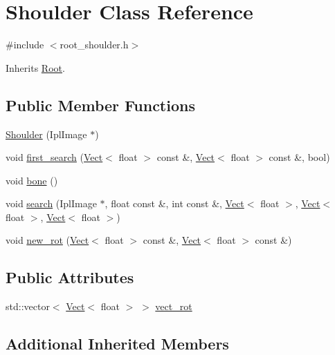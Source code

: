 \hypertarget{class_shoulder}{\section{Shoulder Class Reference}
\label{class_shoulder}
}


{\ttfamily \#include $<$root\+\_\+shoulder.\+h$>$}



Inherits \hyperlink{class_root}{Root}.

\subsection*{Public Member Functions}
\begin{DoxyCompactItemize}
\item 
\hyperlink{class_shoulder_a82e8026dd1fbec038d20d50f094918c9}{Shoulder} (Ipl\+Image $\ast$)
\item 
void \hyperlink{class_shoulder_a50b0698dc9e1fc894c06da6ce51643c2}{first\+\_\+search} (\hyperlink{class_vect}{Vect}$<$ float $>$ const \&, \hyperlink{class_vect}{Vect}$<$ float $>$ const \&, bool)
\item 
void \hyperlink{class_shoulder_a9192e90365e74d81fd26612a8538808f}{bone} ()
\item 
void \hyperlink{class_shoulder_ae1b8830114437b4caa5eef357abcf4a7}{search} (Ipl\+Image $\ast$, float const \&, int const \&, \hyperlink{class_vect}{Vect}$<$ float $>$, \hyperlink{class_vect}{Vect}$<$ float $>$, \hyperlink{class_vect}{Vect}$<$ float $>$)
\item 
void \hyperlink{class_shoulder_a3c90ae16e078e0633cdb970dbd416458}{new\+\_\+rot} (\hyperlink{class_vect}{Vect}$<$ float $>$ const \&, \hyperlink{class_vect}{Vect}$<$ float $>$ const \&)
\end{DoxyCompactItemize}
\subsection*{Public Attributes}
\begin{DoxyCompactItemize}
\item 
std\+::vector$<$ \hyperlink{class_vect}{Vect}$<$ float $>$ $>$ \hyperlink{class_shoulder_a9d8a5bcf46efc7fcd8323410bfdb0646}{vect\+\_\+rot}
\end{DoxyCompactItemize}
\subsection*{Additional Inherited Members}


